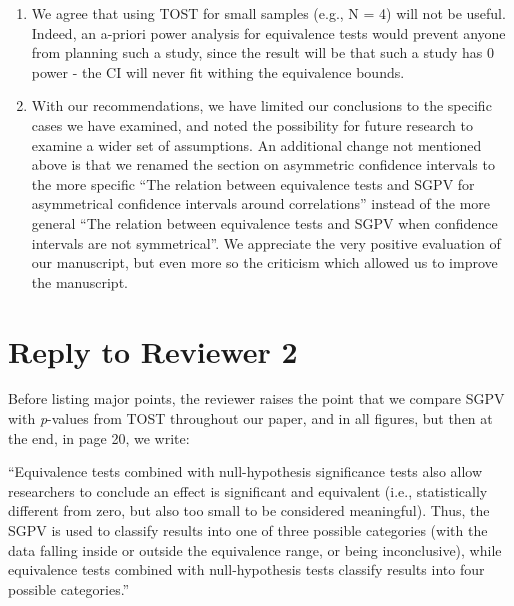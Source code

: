 \documentclass[man]{apa6}
\begin{document}
\begin{enumerate}
{  in its use as a descriptive statistic} from the conclusion. Indeed, we
  acknowledge that \enquote{Although a SGPV of 1 or 0 can be directly
  interpreted, a SGPV between 0 and 1 is not interpretable as
  \enquote{compatibility with the null hypothesis}.} So the SGPV is an
  inferential statistic when interpreted dichotomously. We will leave
  our uncertainty of how specific SGPV values (e.g., SGPV = 0.3) should
  be interpreted to future researchers, and we do not make any
  statements about whether such values are descriptive or inferential.
\item
  We agree that using TOST for small samples (e.g., N = 4) will not be
  useful. Indeed, an a-priori power analysis for equivalence tests would
  prevent anyone from planning such a study, since the result will be
  that such a study has 0 power - the CI will never fit withing the
  equivalence bounds.
\item
  With our recommendations, we have limited our conclusions to the
  specific cases we have examined, and noted the possibility for future
  research to examine a wider set of assumptions. An additional change
  not mentioned above is that we renamed the section on asymmetric
  confidence intervals to the more specific \enquote{The relation
  between equivalence tests and SGPV for asymmetrical confidence
  intervals around correlations} instead of the more general
  \enquote{The relation between equivalence tests and SGPV when
  confidence intervals are not symmetrical}. We appreciate the very
  positive evaluation of our manuscript, but even more so the criticism
  which allowed us to improve the manuscript.
\end{enumerate}

\section{Reply to Reviewer 2}\label{reply-to-reviewer-2}

Before listing major points, the reviewer raises the point that we
compare SGPV with \emph{p}-values from TOST throughout our paper, and in
all figures, but then at the end, in page 20, we write:

\enquote{Equivalence tests combined with null-hypothesis significance
tests also allow researchers to conclude an effect is significant and
equivalent (i.e., statistically different from zero, but also too small
to be considered meaningful). Thus, the SGPV is used to classify results
into one of three possible categories (with the data falling inside or
outside the equivalence range, or being inconclusive), while equivalence
tests combined with null-hypothesis tests classify results into four
possible categories.}
\end{document}
